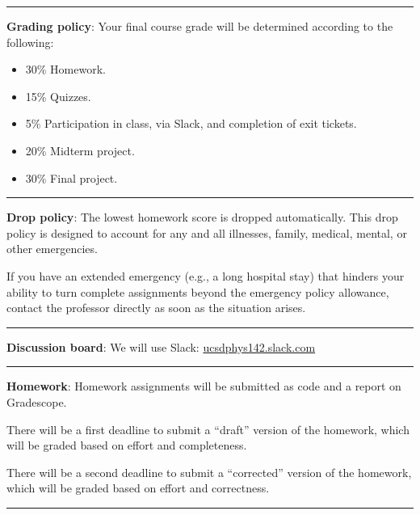 \documentclass[12pt]{article}
\begin{document}
\begin{center}
  \rule{\textwidth}{0.5pt}
\end{center}

\noindent\textbf{Grading policy}: Your final course grade will be determined according to the following:
\begin{itemize}
  \item 30\% Homework.
  \item 15\% Quizzes.
  \item 5\% Participation in class, via Slack, and completion of exit tickets.
  \item 20\% Midterm project.
  \item 30\% Final project.
\end{itemize}

\begin{center}
  \rule{\textwidth}{0.5pt}
\end{center}

\noindent\textbf{Drop policy}: The lowest homework score is dropped automatically.
This drop policy is designed to account for any and all illnesses, family, medical, mental, or other emergencies.

If you have an extended emergency (e.g., a long hospital stay) that hinders your ability to turn complete assignments beyond the emergency policy allowance, contact the professor directly as soon as the situation arises.

\begin{center}
  \rule{\textwidth}{0.5pt}
\end{center}

\noindent\textbf{Discussion board}: We will use Slack: \href{https://join.slack.com/t/ucsdphys142/shared_invite/zt-2a4j1kt2r-e0y1zPOaDqgqjfRnrKfeVA}{ucsdphys142.slack.com}

\begin{center}
  \rule{\textwidth}{0.5pt}
\end{center}


\noindent\textbf{Homework}: Homework assignments will be submitted as code and a report on Gradescope.

There will be a first deadline to submit a ``draft'' version of the homework, which will be graded based on effort and completeness.

There will be a second deadline to submit a ``corrected'' version of the homework, which will be graded based on effort and correctness.

\begin{center}
  \rule{\textwidth}{0.5pt}
\end{center}
\end{document}
